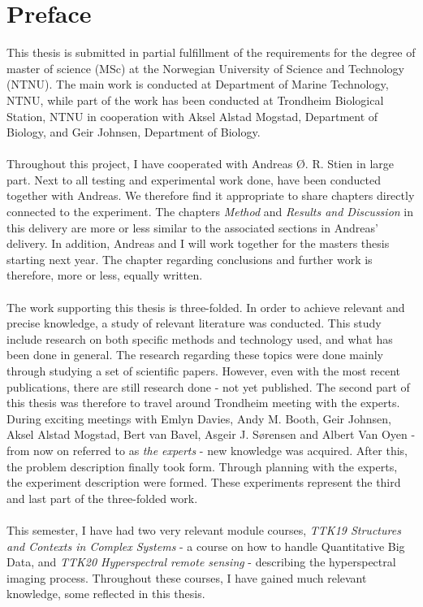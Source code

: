 \hypersetup{pageanchor=true}
%
\chapter*{Preface}
This thesis is submitted in partial fulfillment of the requirements for the degree of master of science (MSc) at the Norwegian University of Science and Technology (NTNU). The main work is conducted at Department of Marine Technology, NTNU, while part of the work has been conducted at Trondheim Biological Station, NTNU in cooperation with Aksel Alstad Mogstad, Department of Biology, and Geir Johnsen, Department of Biology. 
\\\\
Throughout this project, I have cooperated with Andreas {\O}. R. Stien in large part. Next to all testing and experimental work done, have been conducted together with Andreas. We therefore find it appropriate to share chapters directly connected to the experiment. The chapters \textit{Method} and \textit{Results and Discussion} in this delivery are more or less similar to the associated sections in Andreas’ delivery. In addition, Andreas and I will work together for the masters thesis starting next year. The chapter regarding conclusions and further work is therefore, more or less, equally written. 
\\\\
The work supporting this thesis is three-folded. In order to achieve relevant and precise knowledge, a study of relevant literature was conducted. This study include research on both specific methods and technology used, and what has been done in general. The research regarding these topics were done mainly through studying a set of scientific papers. However, even with the most recent publications, there are still research done - not yet published. The second part of this thesis was therefore to travel around Trondheim meeting with the experts. During exciting meetings with Emlyn Davies, Andy M. Booth, Geir Johnsen, Aksel Alstad Mogstad, Bert van Bavel, Asgeir J. S{\o}rensen and Albert Van Oyen - from now on referred to as \textit{the experts} - new knowledge was acquired. After this, the problem description finally took form. Through planning with the experts, the experiment description were formed. These experiments represent the third and last part of the three-folded work. 
\\\\
This semester, I have had two very relevant module courses, \textit{TTK19 Structures and Contexts in Complex Systems} -  a course on how to handle Quantitative Big Data, and \textit{TTK20 Hyperspectral remote sensing} - describing the hyperspectral imaging process. Throughout these courses, I have gained much relevant knowledge, some reflected in this thesis.


